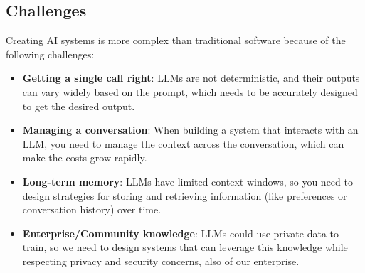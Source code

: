\subsection{Challenges}
Creating AI systems is more complex than traditional software because of the following challenges:
\begin{itemize}
    \item \textbf{Getting a single call right}: LLMs are not deterministic, and their outputs can vary widely based on the prompt, which needs to be accurately designed to get the desired output.
    \item \textbf{Managing a conversation}: When building a system that interacts with an LLM, you need to manage the context across the conversation, which can make the costs grow rapidly.
    \item \textbf{Long-term memory}: LLMs have limited context windows, so you need to design strategies for storing and retrieving information (like preferences or conversation history) over time.
    \item \textbf{Enterprise/Community knowledge}: LLMs could use private data to train, so we need to design systems that can leverage this knowledge while respecting privacy and security concerns, also of our enterprise.
\end{itemize}